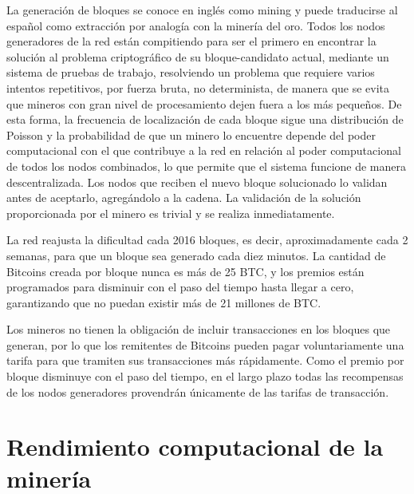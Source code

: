 La generaci\'on de bloques se conoce en ingl\'es como mining y puede traducirse al español como extracci\'on por analog\'ia con la miner\'ia del oro. Todos los nodos generadores de la red est\'an compitiendo para ser el primero en encontrar la soluci\'on al problema criptogr\'afico de su bloque-candidato actual, mediante un sistema de pruebas de trabajo, resolviendo un problema que requiere varios intentos repetitivos, por fuerza bruta, no determinista, de manera que se evita que mineros con gran nivel de procesamiento dejen fuera a los m\'as pequeños. De esta forma, la frecuencia de localizaci\'on de cada bloque sigue una distribuci\'on de Poisson y la probabilidad de que un minero lo encuentre depende del poder computacional con el que contribuye a la red en relaci\'on al poder computacional de todos los nodos combinados, lo que permite que el sistema funcione de manera descentralizada. Los nodos que reciben el nuevo bloque solucionado lo validan antes de aceptarlo, agreg\'andolo a la cadena. La validaci\'on de la soluci\'on proporcionada por el minero es trivial y se realiza inmediatamente.

La red reajusta la dificultad cada 2016 bloques, es decir, aproximadamente cada 2 semanas, para que un bloque sea generado cada diez minutos. La cantidad de Bitcoins creada por bloque nunca es m\'as de 25 BTC, y los premios est\'an programados para disminuir con el paso del tiempo hasta llegar a cero, garantizando que no puedan existir m\'as de 21 millones de BTC.

Los mineros no tienen la obligaci\'on de incluir transacciones en los bloques que generan, por lo que los remitentes de Bitcoins pueden pagar voluntariamente una tarifa para que tramiten sus transacciones m\'as r\'apidamente. Como el premio por bloque disminuye con el paso del tiempo, en el largo plazo todas las recompensas de los nodos generadores provendr\'an \'unicamente de las tarifas de transacci\'on.


\section{Rendimiento computacional de la miner\'ia}


